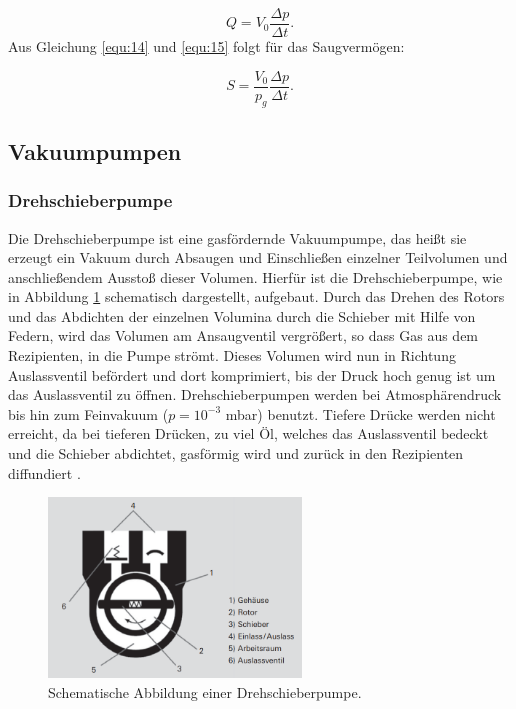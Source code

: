     \begin{equation}
    \label{equ:15}
        Q = V_0 \frac{\Delta p}{\Delta t}.
    \end{equation}
Aus Gleichung \eqref{equ:14} und \eqref{equ:15} folgt für das Saugvermögen:

    \begin{equation}
    \label{equ:16}
        S = \frac{V_0}{p_g} \frac{\Delta p}{\Delta t}.
    \end{equation}
    

\subsection{Vakuumpumpen}
\subsubsection{Drehschieberpumpe}
Die Drehschieberpumpe ist eine gasfördernde Vakuumpumpe, das heißt sie erzeugt ein Vakuum durch Absaugen und
Einschließen einzelner Teilvolumen und anschließendem Ausstoß dieser Volumen.
Hierfür ist die Drehschieberpumpe, wie in Abbildung \ref{fig:Drehschieberpumpe} schematisch dargestellt, aufgebaut.
Durch das Drehen des Rotors und das Abdichten der einzelnen Volumina durch die Schieber mit Hilfe von Federn, 
wird das Volumen am Ansaugventil vergrößert, so dass Gas aus dem Rezipienten, in die Pumpe strömt. Dieses Volumen wird nun 
in Richtung Auslassventil befördert und dort komprimiert, bis der Druck hoch genug ist um das Auslassventil zu öffnen.
Drehschieberpumpen werden bei Atmosphärendruck bis hin zum Feinvakuum ($p = 10^{-3}$ mbar) benutzt.
Tiefere Drücke werden nicht erreicht, da bei tieferen Drücken, zu viel Öl, welches das Auslassventil bedeckt und die Schieber abdichtet, 
gasförmig wird und zurück in den Rezipienten diffundiert \cite{Pfeiffer, S.60,61}. 
    
    \begin{figure}
        \centering
        \includegraphics[width=0.6\textwidth]{Drehschieberpumpe.png}
        \caption{Schematische Abbildung einer Drehschieberpumpe.}
        \label{fig:Drehschieberpumpe}
    \end{figure}

